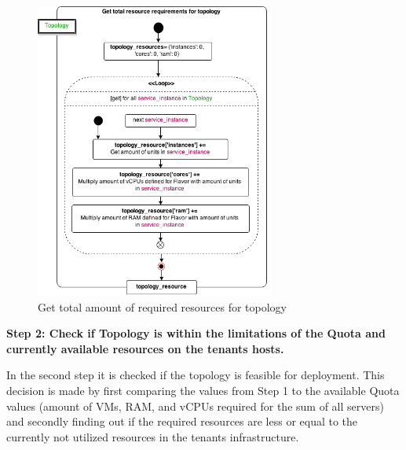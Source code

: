 \begin{figure}[H]
\centering

\includegraphics[width=0.7\textwidth]{images/implementation/cm_get_topology_requirements}

\caption{Get total amount of required resources for topology}
\end{figure}
\newpage
\textbf{Step 2: Check if Topology is within the limitations of the Quota and currently available resources on the tenants hosts.}

In the second step it is checked if the topology is feasible for deployment. This decision is made by first comparing the values from Step 1 to the available Quota values (amount of VMs, RAM, and vCPUs required for the sum of all servers) and secondly finding out if the required resources are less or equal to the currently not utilized resources in the tenants infrastructure.


